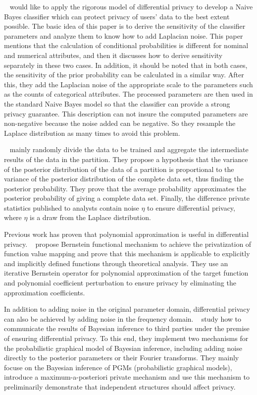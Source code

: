 \documentclass[draftclsnofoot,onecolumn,twoside]{IEEEtran}
\begin{document}
~\cite{Vaidya2013Differentially} would like to apply the rigorous model of differential privacy to develop a Naive Bayes classifier which can protect privacy of users' data to the best extent possible. The basic idea of this paper is to derive the sensitivity of the classifier parameters and analyze them to know how to add Laplacian noise. This paper mentions that the calculation of conditional probabilities is different for nominal and numerical attributes, and then it discusses how to derive sensitivity separately in these two cases. In addition, it should be noted that in both cases, the sensitivity of the prior probability can be calculated in a similar way. After this, they add the Laplacian noise of the appropriate scale to the parameters such as the counts of categorical attributes. The processed parameters are then used in the standard Naive Bayes model so that the classifier can provide a strong privacy guarantee. This description can not insure the computed parameters are non-negative because the noise added can be negative. So they resample the Laplace distribution as many times to avoid this problem.


~\cite{two} mainly randomly divide the data to be trained and aggregate the intermediate results of the data in the partition. They propose a hypothesis that the variance of the posterior distribution of the data of a partition is proportional to the variance of the posterior distribution of the complete data set, thus finding the posterior probability. They prove that the average probability approximates the posterior probability of giving a complete data set. Finally, the difference private statistics published to analysts contain noise $\eta$ to ensure differential privacy, where $\eta$ is a draw from the Laplace distribution.

Previous work has proven that polynomial approximation is useful in differential privacy. ~\cite{Ald2015The} propose Bernstein functional mechanism to achieve the privatization of function value mapping and prove that this mechanism is applicable to explicitly and implicitly defined functions through theoretical analysis. They use an iterative Bernstein operator for polynomial approximation of the target function and polynomial coefficient perturbation to ensure privacy by eliminating the approximation coefficients.




In addition to adding noise in the original parameter domain, differential privacy can also be achieved by adding noise in the frequency domain.
~\cite{Zhang2015On} study how to communicate the results of Bayesian inference to third parties under the premise of ensuring differential privacy. To this end, they implement two mechanisms for the probabilistic graphical model of Bayesian inference, including adding noise directly to the posterior parameters or their Fourier transforms. They mainly focuse on the Bayesian inference of PGMs (probabilistic graphical models), introduce a maximum-a-posteriori private mechanism and use this mechanism to preliminarily demonstrate that independent structures should affect privacy.
\end{document}
